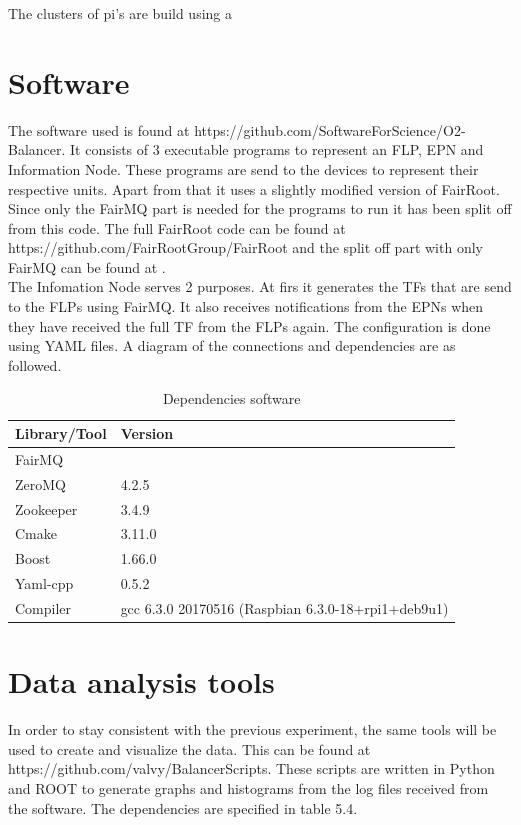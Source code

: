 \newpage

The clusters of pi's are build using a 

\section{Software}
The software used is found at https://github.com/SoftwareForScience/O2-Balancer. It consists of 3 executable programs to represent an FLP, EPN and Information Node. These programs are send to the devices to represent their respective units. Apart from that it uses a slightly modified version of FairRoot. Since only the FairMQ part is needed for the programs to run it has been split off from this code. The full FairRoot code can be found at \\ 
https://github.com/FairRootGroup/FairRoot and the split off part with only FairMQ can be found at
. \\ 
The Infomation Node serves 2 purposes. At firs it generates the TFs that are send to the FLPs using FairMQ. It also receives notifications from the EPNs when they have received the full TF from the FLPs again. The configuration is done using YAML files. A diagram of the connections and dependencies are as followed.


\begin{table}[htb]
\begin{tabular}{| l | l |}
\hline
Library/Tool & Version \\ \hline
FairMQ & \\ \hline
ZeroMQ & 4.2.5\\ \hline
Zookeeper & 3.4.9 \\ \hline
Cmake & 3.11.0 \\ \hline
Boost & 1.66.0 \\ \hline
Yaml-cpp & 0.5.2 \\ \hline
Compiler & gcc 6.3.0 20170516 (Raspbian 6.3.0-18+rpi1+deb9u1)\\ \hline
\end{tabular}
\caption{Dependencies software}
\end{table}

\section{Data analysis tools}
In order to stay consistent with the previous experiment, the same tools will be used to create and visualize the data. This can be found at \\ https://github.com/valvy/BalancerScripts. These scripts are written in Python and ROOT to generate graphs and histograms from the log files received from the software. The dependencies are specified in table 5.4.

